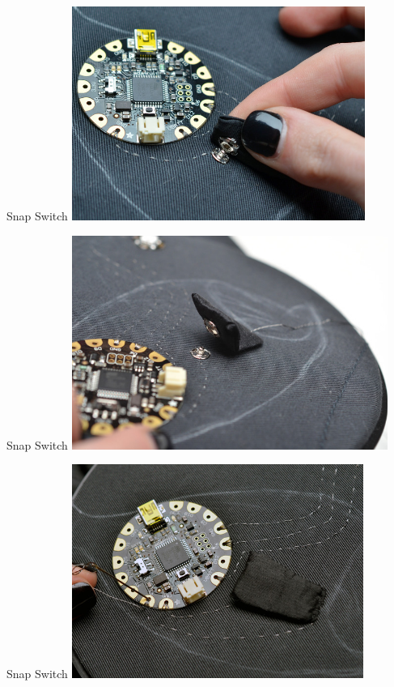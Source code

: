 \documentclass[aspectratio=169]{beamer}
\begin{document}
\begin{frame}[fragile]{Snap Switch}
\includegraphics[height=2.75in]{flora-angler-embroidery-22.jpg}
\end{frame}
\begin{frame}[fragile]{Snap Switch}
\includegraphics[height=2.75in]{flora-angler-embroidery-23.jpg}
\end{frame}
\begin{frame}[fragile]{Snap Switch}
\includegraphics[height=2.75in]{flora-angler-embroidery-24.jpg}
\end{frame}
\end{document}
